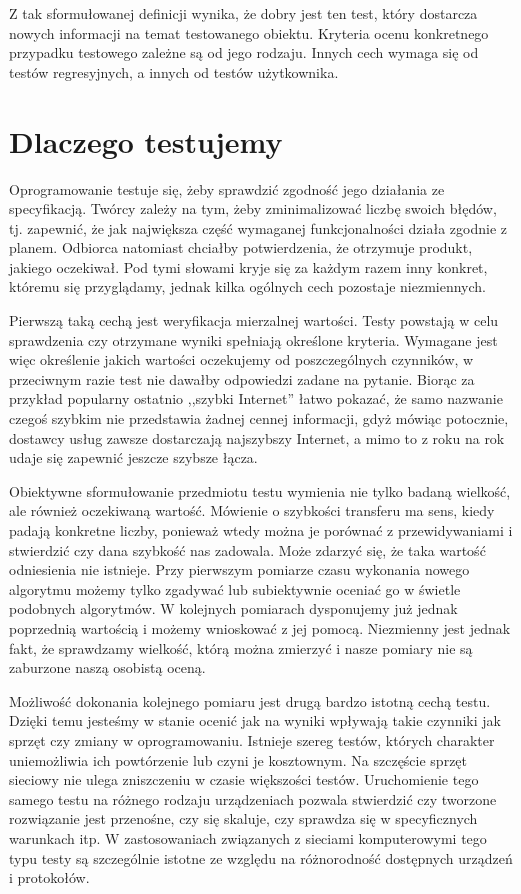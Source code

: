\documentclass[00-praca-magisterska.tex]{subfiles}
\begin{document}
Z tak sformułowanej definicji wynika, że dobry jest ten test, który dostarcza
nowych informacji na temat testowanego obiektu. Kryteria ocenu konkretnego
przypadku testowego zależne są od jego rodzaju. Innych cech wymaga się od
testów regresyjnych, a innych od testów użytkownika.

\section{Dlaczego testujemy}
\label{dlaczego-testujemy}

Oprogramowanie testuje się, żeby sprawdzić zgodność jego działania ze
specyfikacją. Twórcy zależy na tym, żeby zminimalizować liczbę swoich błędów,
tj. zapewnić, że jak największa część wymaganej funkcjonalności działa zgodnie
z planem. Odbiorca natomiast chciałby potwierdzenia, że otrzymuje produkt,
jakiego oczekiwał. Pod tymi słowami kryje się za każdym razem inny konkret,
któremu się przyglądamy, jednak kilka ogólnych cech pozostaje niezmiennych.

Pierwszą taką cechą jest weryfikacja mierzalnej wartości. Testy powstają w celu
sprawdzenia czy otrzymane wyniki spełniają określone kryteria. Wymagane jest
więc określenie jakich wartości oczekujemy od poszczególnych czynników, w
przeciwnym razie test nie dawałby odpowiedzi zadane na pytanie. Biorąc za
przykład popularny ostatnio ,,szybki Internet'' łatwo pokazać, że samo nazwanie
czegoś szybkim nie przedstawia żadnej cennej informacji, gdyż mówiąc potocznie,
dostawcy usług zawsze dostarczają najszybszy Internet, a mimo to z roku na rok
udaje się zapewnić jeszcze szybsze łącza. 

Obiektywne sformułowanie przedmiotu testu wymienia nie tylko badaną wielkość,
ale również oczekiwaną wartość. Mówienie o szybkości transferu ma sens, kiedy
padają konkretne liczby, ponieważ wtedy można je porównać z przewidywaniami i
stwierdzić czy dana szybkość nas zadowala. Może zdarzyć się, że taka wartość
odniesienia nie istnieje. Przy pierwszym pomiarze czasu wykonania nowego
algorytmu możemy tylko zgadywać lub subiektywnie oceniać go w świetle podobnych
algorytmów. W kolejnych pomiarach dysponujemy już jednak poprzednią wartością i
możemy wnioskować z jej pomocą. Niezmienny jest jednak fakt, że sprawdzamy
wielkość, którą można zmierzyć i nasze pomiary nie są zaburzone naszą osobistą
oceną.

Możliwość dokonania kolejnego pomiaru jest drugą bardzo istotną cechą testu.
Dzięki temu jesteśmy w stanie ocenić jak na wyniki wpływają takie czynniki jak
sprzęt czy zmiany w oprogramowaniu. Istnieje szereg testów, których charakter
uniemożliwia ich powtórzenie lub czyni je kosztownym. Na szczęście sprzęt
sieciowy nie ulega zniszczeniu w czasie większości testów. Uruchomienie tego
samego testu na różnego rodzaju urządzeniach pozwala stwierdzić czy tworzone
rozwiązanie jest przenośne, czy się skaluje, czy sprawdza się w specyficznych
warunkach itp. W zastosowaniach związanych z sieciami komputerowymi tego typu
testy są szczególnie istotne ze względu na różnorodność dostępnych urządzeń i
protokołów.
\end{document}
